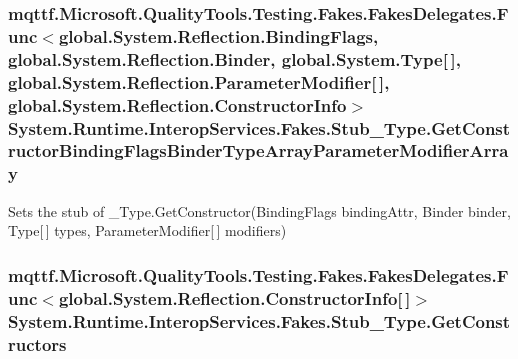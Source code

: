 \hypertarget{class_system_1_1_runtime_1_1_interop_services_1_1_fakes_1_1_stub___type_a0d6255d266b018eb804f3a7847b26893}{
\subsubsection[{Get\-Constructor\-Binding\-Flags\-Binder\-Type\-Array\-Parameter\-Modifier\-Array}]{\setlength{\rightskip}{0pt plus 5cm}mqttf.\-Microsoft.\-Quality\-Tools.\-Testing.\-Fakes.\-Fakes\-Delegates.\-Func$<$global.\-System.\-Reflection.\-Binding\-Flags, global.\-System.\-Reflection.\-Binder, global.\-System.\-Type\mbox{[}$\,$\mbox{]}, global.\-System.\-Reflection.\-Parameter\-Modifier\mbox{[}$\,$\mbox{]}, global.\-System.\-Reflection.\-Constructor\-Info$>$ System.\-Runtime.\-Interop\-Services.\-Fakes.\-Stub\-\_\-\-Type.\-Get\-Constructor\-Binding\-Flags\-Binder\-Type\-Array\-Parameter\-Modifier\-Array}}\label{class_system_1_1_runtime_1_1_interop_services_1_1_fakes_1_1_stub___type_a0d6255d266b018eb804f3a7847b26893}


Sets the stub of \-\_\-\-Type.\-Get\-Constructor(\-Binding\-Flags binding\-Attr, Binder binder, Type\mbox{[}$\,$\mbox{]} types, Parameter\-Modifier\mbox{[}$\,$\mbox{]} modifiers)

\hypertarget{class_system_1_1_runtime_1_1_interop_services_1_1_fakes_1_1_stub___type_aab767f108dc7d3f25cda7d8be7977d53}{
\subsubsection[{Get\-Constructors}]{\setlength{\rightskip}{0pt plus 5cm}mqttf.\-Microsoft.\-Quality\-Tools.\-Testing.\-Fakes.\-Fakes\-Delegates.\-Func$<$global.\-System.\-Reflection.\-Constructor\-Info\mbox{[}$\,$\mbox{]}$>$ System.\-Runtime.\-Interop\-Services.\-Fakes.\-Stub\-\_\-\-Type.\-Get\-Constructors}}\label{class_system_1_1_runtime_1_1_interop_services_1_1_fakes_1_1_stub___type_aab767f108dc7d3f25cda7d8be7977d53}


